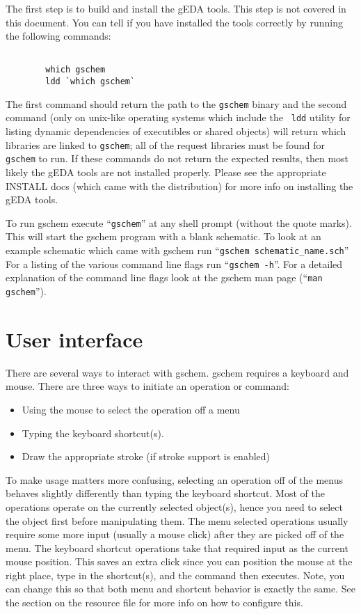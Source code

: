 \documentclass{article}
\begin{document}
The first step is to build and install the gEDA tools.
This step is not covered in this document.  You can tell if you have
installed the tools correctly by running the following commands:
\begin{verbatim}

        which gschem
        ldd `which gschem`

\end{verbatim}
The first command should return the path to the {\tt gschem} binary and the
second command (only on unix-like operating systems which include the {\tt
ldd} utility for listing dynamic dependencies of executibles or shared
objects) will return which libraries are linked to {\tt gschem}; all of
the request libraries must be found for {\tt gschem} to run.  If these
commands do not return the expected results, then most likely the gEDA
tools are not installed properly.  Please see the appropriate INSTALL
docs (which came with the distribution) for more info on installing the
gEDA tools.


To run gschem execute ``{\tt gschem}'' at any shell prompt (without
the quote marks).  This will
start the gschem program with a blank schematic.  To look at an
example schematic which came with gschem run ``{\tt gschem
  schematic\_name.sch}'' For a listing of the various command line flags
run ``{\tt gschem -h}''.  For a detailed explanation of the command line
flags look at the gschem man page (``{\tt man gschem}'').

\section{User interface}
There are several ways to interact with gschem.  gschem
requires a keyboard and mouse.  There are three ways to initiate an 
operation or command:
\begin{itemize}
\item Using the mouse to select the operation off a menu 
\item Typing the keyboard shortcut(s).
\item Draw the appropriate stroke (if stroke support is enabled)
\end{itemize}
To make usage matters more confusing, selecting an operation
off of the menus behaves slightly differently than typing the
keyboard shortcut.  Most of the operations operate on the currently
selected object(s), hence you need to select the object first before
manipulating them.  The menu selected operations usually require some
more input (usually a mouse click) after they are picked off of the menu.
The keyboard shortcut operations take that required input as the current
mouse position.  This saves an extra click since you can position
the mouse at the right place, type in the shortcut(s), and the command
then executes.  Note, you can change this so that both menu and shortcut
behavior is exactly the same.  See the section on the resource file for
more info on how to configure this.
\end{document}
